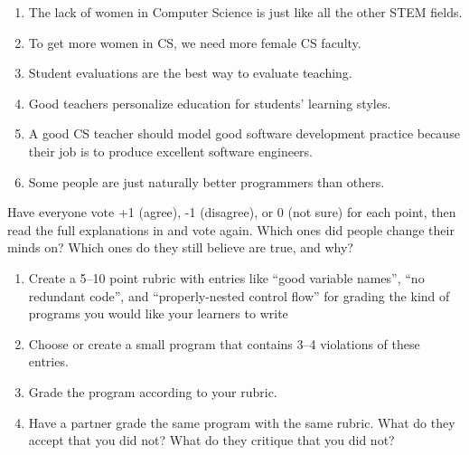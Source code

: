 \begin{enumerate}
\item
  The lack of women in Computer Science is just like all the other STEM fields.
\item
  To get more women in CS, we need more female CS faculty.
\item
  Student evaluations are the best way to evaluate teaching.
\item
  Good teachers personalize education for students' learning styles.
\item
  A good CS teacher should model good software development practice
  because their job is to produce excellent software engineers.
\item
  Some people are just naturally better programmers than others.
\end{enumerate}

Have everyone vote +1 (agree), -1 (disagree), or 0 (not sure) for each point,
then read the full explanations in
and vote again.
Which ones did people change their minds on?
Which ones do they still believe are true, and why?


\begin{enumerate}

\item
  Create a 5--10 point rubric
  with entries like ``good variable names'', ``no redundant code'', and ``properly-nested control flow''
  for grading the kind of programs you would like your learners to write

\item
  Choose or create a small program that contains 3--4 violations of these entries.

\item
  Grade the program according to your rubric.

\item
  Have a partner grade the same program with the same rubric.
  What do they accept that you did not?
  What do they critique that you did not?

\end{enumerate}
